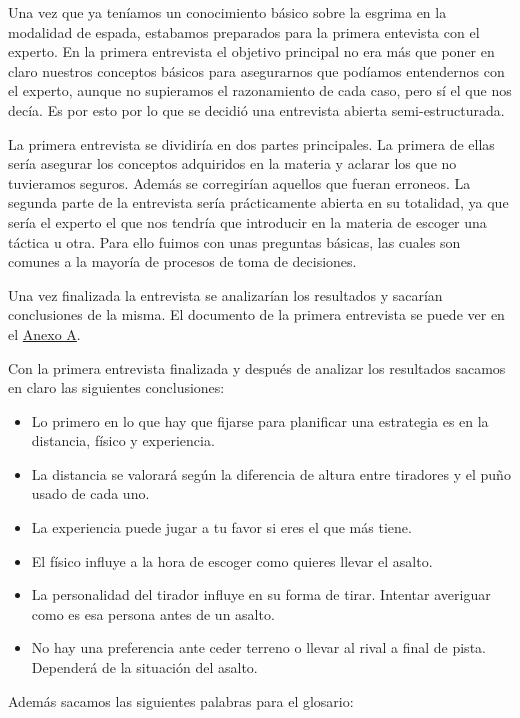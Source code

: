 Una vez que ya teníamos un conocimiento básico sobre la esgrima en la modalidad de espada,
estabamos preparados para la primera entevista con el experto. En la primera entrevista el
objetivo principal no era más que poner en claro nuestros conceptos básicos para asegurarnos
que podíamos entendernos con el experto, aunque no supieramos el razonamiento de cada caso,
pero sí el que nos decía. Es por esto por lo que se decidió una entrevista abierta semi-estructurada.

La primera entrevista se dividiría en dos partes principales. La primera de ellas sería
asegurar los conceptos adquiridos en la materia y aclarar los que no tuvieramos seguros.
Además se corregirían aquellos que fueran erroneos. La segunda parte de la entrevista
sería prácticamente abierta en su totalidad, ya que sería el experto el que nos tendría
que introducir en la materia de escoger una táctica u otra. Para ello fuimos con unas
preguntas básicas, las cuales son comunes a la mayoría de procesos de toma de decisiones.

Una vez finalizada la entrevista se analizarían los resultados y sacarían conclusiones de la misma.
El documento de la primera entrevista se puede ver en el \hyperref[cap:Entrevistas]{Anexo A}.

Con la primera entrevista finalizada y después de analizar los resultados sacamos en claro
las siguientes conclusiones:

\begin{itemize}
  \item Lo primero en lo que hay que fijarse para planificar una estrategia es en la distancia,
    físico y experiencia.
  \item La distancia se valorará según la diferencia de altura entre tiradores y el puño usado
    de cada uno.
  \item La experiencia puede jugar a tu favor si eres el que más tiene.
  \item El físico influye a la hora de escoger como quieres llevar el asalto.
  \item La personalidad del tirador influye en su forma de tirar. Intentar averiguar como es esa persona
    antes de un asalto.
  \item No hay una preferencia ante ceder terreno o llevar al rival a final de pista. Dependerá de la
    situación del asalto.
\end{itemize}

Además sacamos las siguientes palabras para el glosario:

